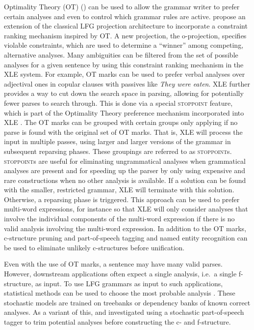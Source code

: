\documentclass[output=paper,hidelinks]{langscibook}
\begin{document}
 Optimality Theory (OT) () can be used to allow the grammar writer to prefer certain analyses and even to control which grammar rules are active. \cite{franketal98,franketal01} propose an extension of the classical LFG projection architecture to incorporate a constraint ranking mechanism inspired by OT. A new projection, the o-projection, specifies violable constraints, which are used to determine a ``winner'' among competing, alternative analyses.  Many ambiguities can be filtered from the set of possible analyses for a given sentence by using this constraint ranking mechanism in the XLE system.  For example, OT marks can be used to prefer verbal analyses over adjectival ones in copular clauses with passives like {\em They were eaten}. XLE further provides a way to cut down the  search space in parsing, allowing for potentially fewer parses to search through. This is done via a special \textsc{stoppoint} feature, which is part of the Optimality Theory preference mechanism incorporated into XLE \citep{kingetal00}.  The OT marks can be grouped with certain groups only applying if no parse is found with the original set of OT marks.   That is, XLE will process the input in multiple passes, using larger and larger versions of the grammar in subsequent reparsing phases. These groupings are referred to as \textsc{stoppoint}s. \textsc{stoppoint}s are useful for eliminating ungrammatical analyses when grammatical analyses are present and for speeding up the parser by only using expensive and rare constructions when no other analysis is available.  If a solution can be found with the smaller, restricted grammar, XLE will terminate with this solution. Otherwise, a reparsing phase is triggered. This approach can be used to prefer multi-word expressions, for instance so that XLE will only consider analyses that involve the individual components of the multi-word expression if there is no valid analysis involving the multi-word expression. In addition to the OT marks, c-structure pruning \citep{cahill-etal-2008-speeding} and part-of-speech tagging and named entity recognition \citep{kaplanking03,dalrymple06,kkpat15} can be used to eliminate unlikely c-structures before unification.
         
Even with the use of OT marks, a sentence may have many valid parses. However, downstream applications often expect a single analysis, i.e.\ a single f-struc\-ture, as input. To use LFG grammars as input to such applications, statistical methods can be used to choose the most probable analysis \citep{Riezler2002King}. These stochastic models are trained on treebanks or dependency banks of known correct analyses. As a variant of this, \cite{dalrymple06} and \cite{kkpat15} investigated using a stochastic part-of-speech tagger to trim potential analyses before constructing the c- and f-structure.
\end{document}
